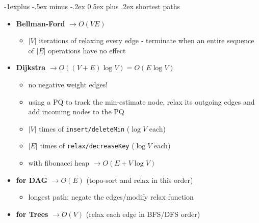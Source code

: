 \documentclass[10pt]{article}
\makeatletter
\renewcommand{\subsection}{\@startsection{subsection}{2}{0mm}%
                                {-1explus -.5ex minus -.2ex}%
                                {0.5ex plus .2ex}%
                                {\normalfont\normalsize\bfseries}}
\newcommand{\abs}[1]{\vert #1 \vert}
\let\then\rightarrow
\newcommand{\code}[1]{\textcolor{mygreen}{\texttt{#1}}}
\makeatother
\begin{document}
\begin{multicols}{3}
\subsection{shortest paths}
\begin{itemize}
    \item \textbf{Bellman-Ford} $\then O(VE)$
    \begin{itemize}
        \item $\abs{V}$ iterations of relaxing every edge - terminate when an entire sequence of $\abs{E}$ operations have no effect
    \end{itemize}
    \item \textbf{Dijkstra} $\then O((V+E)\log V) = O(E\log V)$
    \begin{itemize}
        \item no negative weight edges!
        \item using a PQ to track the min-estimate node, relax its outgoing edges and add incoming nodes to the PQ
        \item $\abs{V}$ times of \code{insert/deleteMin} ($\log V$ each)
        \item $\abs{E}$ times of \code{relax/decreaseKey} ($\log V$ each)
        \item with fibonacci heap $\then O(E + V \log V)$
    \end{itemize}
    \item \textbf{for DAG} $\then O(E)$ (topo-sort and relax in this order)
    \begin{itemize}
        \item longest path: negate the edges/modify relax function
    \end{itemize}
    \item \textbf{for Trees} $\then O(V)$ (relax each edge in BFS/DFS order)
\end{itemize}


\end{multicols}
\end{document}
